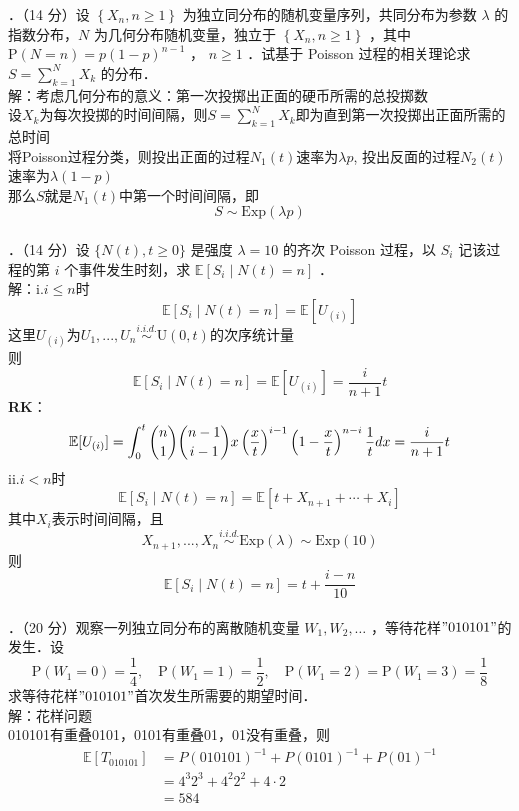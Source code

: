 \documentclass[UTF8,openany]{book}
\begin{document}
．（14 分）设 $\left\{X_n, n \geq 1\right\}$ 为独立同分布的随机变量序列，共同分布为参数 $\lambda$ 的指数分布，$N$ 为几何分布随机变量，独立于 $\left\{X_n, n \geq 1\right\}$ ，其中 $\mathrm{P}(N=n)=p(1-p)^{n-1}$ ， $n \geq 1$ ．试基于 Poisson 过程的相关理论求 $S=\sum\limits_{k=1}^N X_k$ 的分布．\\
解：考虑几何分布的意义：第一次投掷出正面的硬币所需的总投掷数\\
设$X_k$为每次投掷的时间间隔，则$S=\sum\limits_{k=1}^N X_k$即为直到第一次投掷出正面所需的总时间\\
将Poisson过程分类，则投出正面的过程$N_1(t)$速率为$\lambda p$,
投出反面的过程$N_2(t)$速率为$\lambda (1-p)$\\
那么$S$就是$N_1(t)$中第一个时间间隔，即
\[
S \sim \mathrm{Exp}(\lambda p)
\]\\





．（14 分）设 $\{N(t), t \geq 0\}$ 是强度 $\lambda=10$ 的齐次 Poisson 过程，以 $S_i$ 记该过程的第 $i$ 个事件发生时刻，求 $\mathbb{E}\left[S_i \mid N(t)=n\right]$ ．\\
解：i.$i \le n$时\\
\[
\mathbb{E}[S_i\mid N(t)=n]=\mathbb{E}[U_{(i)}]
\]
这里$U_{(i)}$为$U_1,...,U_n\stackrel{i.i.d.}{\sim} \mathrm{U}(0,t)$的次序统计量\\
则
\[
\mathbb{E}[S_i\mid N(t)=n]=\mathbb{E}[U_{(i)}]=\frac{i}{n+1}t
\]
\textbf{RK}：\\
$$
\mathbb{E}[U_{(i)}]=\int_{0}^{t} \dbinom{n}{1} \dbinom{n-1}{i-1} x\left(\frac{x}{t} \right)^{i-1} \left( 1-\frac{x}{t}\right)^{n-i} \frac{1}{t} dx=  \frac{i}{n+1}t
$$
ii.$i<n$时
\[
\mathbb{E}[S_i\mid N(t)=n]=\mathbb{E}[t+X_{n+1}+\cdots+X_i]
\]
其中$X_i$表示时间间隔，且
\[
X_{n+1},...,X_n \stackrel{i.i.d.}{\sim} \mathrm{Exp}(\lambda)\sim \mathrm{Exp}(10)
\]
则
\[
\mathbb{E}[S_i\mid N(t)=n]=t+\frac{i-n}{10}
\]\\




．（20 分）观察一列独立同分布的离散随机变量 $W_1, W_2, \ldots$ ，等待花样$" 010101 "$的发生．设
$$
\mathrm{P}\left(W_1=0\right)=\frac{1}{4}, \quad \mathrm{P}\left(W_1=1\right)=\frac{1}{2}, \quad \mathrm{P}\left(W_1=2\right)=\mathrm{P}\left(W_1=3\right)=\frac{1}{8}
$$
求等待花样$"010101"$首次发生所需要的期望时间．\\
解：花样问题\\
010101有重叠0101，0101有重叠01，01没有重叠，则\\
\begin{align*}
	\mathbb{E}[T_{010101}] & =P(010101)^{-1}+P(0101)^{-1}+P(01)^{-1} \\
	& =4^3 2^3+4^2 2^2+4 \cdot 2\\
	&=584
\end{align*}
\newpage
\end{document}
